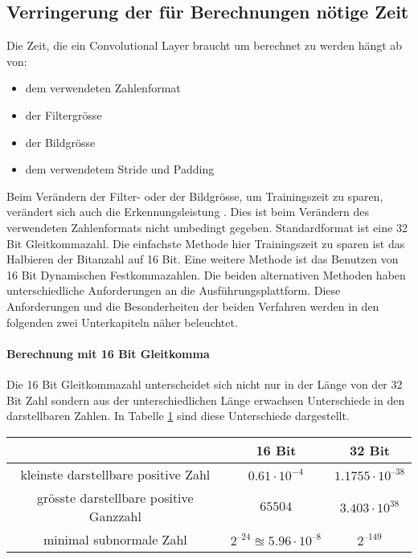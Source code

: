 \subsection{Verringerung der für Berechnungen nötige Zeit}




Die Zeit, die ein Convolutional Layer braucht um berechnet zu werden hängt ab von:
\begin{itemize}
 \item dem verwendeten Zahlenformat
 \item der Filtergr\"osse
 \item der Bildgr\"osse
 \item dem verwendetem Stride und Padding
\end{itemize}



Beim Verändern der Filter- oder der Bildgr\"osse, um Trainingszeit zu sparen, ver\"andert sich auch die Erkennungsleistung . Dies ist beim Verändern des verwendeten Zahlenformats nicht umbedingt gegeben. Standardformat ist eine 32 Bit Gleitkommazahl. Die einfachste Methode hier Trainingszeit zu sparen ist das Halbieren der Bitanzahl auf 16 Bit. Eine weitere Methode ist das Benutzen von 16 Bit Dynamischen Festkommazahlen.
Die beiden alternativen Methoden haben unterschiedliche Anforderungen an die Ausführungsplattform. Diese Anforderungen und die Besonderheiten der beiden Verfahren werden in den folgenden zwei Unterkapiteln näher beleuchtet.


\paragraph{Berechnung mit 16 Bit Gleitkomma}
\cite{ieee}
Die 16 Bit Gleitkommazahl unterscheidet sich nicht nur in der Länge von der 32 Bit Zahl sondern aus der unterschiedlichen Länge erwachsen Unterschiede in den darstellbaren Zahlen. In Tabelle \ref{tab:numbers} sind diese Unterschiede dargestellt. 

\begin{table}[H]
\label{tab:numbers}
\begin{tabular}{|c|c|c|}
\hline                                       & 16 Bit                             & 32 Bit              \\ \hline
kleinste darstellbare positive Zahl    & $0.61  \cdot 10^{-4}$              & $1.1755 \cdot 10^{–38}$ \\ \hline
grösste darstellbare positive Ganzzahl & $65504$                            & $ 3.403 \cdot 10^{38}$  \\ \hline
minimal subnormale Zahl                & $2^{–24} \approxeq 5.96 \cdot 10^{–8}$ & $ 2^{–149}$         \\ \hline
\end{tabular}
\end{table}

